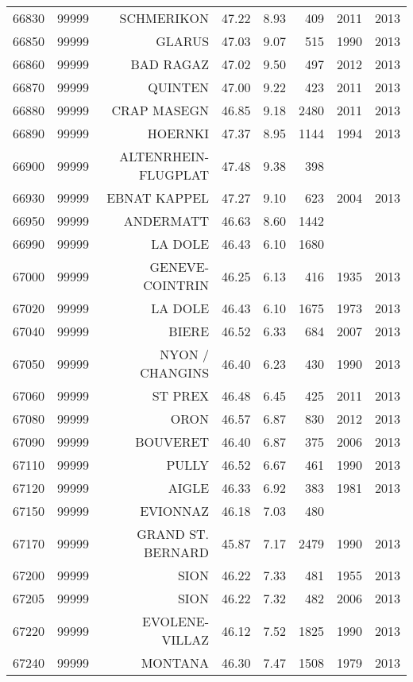 \begin{longtable}{rrrrrrrr}
  66830 & 99999 & SCHMERIKON & 47.22 & 8.93 & 409 & 2011 & 2013 \\ 
  66850 & 99999 & GLARUS & 47.03 & 9.07 & 515 & 1990 & 2013 \\ 
  66860 & 99999 & BAD RAGAZ & 47.02 & 9.50 & 497 & 2012 & 2013 \\ 
  66870 & 99999 & QUINTEN & 47.00 & 9.22 & 423 & 2011 & 2013 \\ 
  66880 & 99999 & CRAP MASEGN & 46.85 & 9.18 & 2480 & 2011 & 2013 \\ 
  66890 & 99999 & HOERNKI & 47.37 & 8.95 & 1144 & 1994 & 2013 \\ 
  66900 & 99999 & ALTENRHEIN-FLUGPLAT & 47.48 & 9.38 & 398 &  &  \\ 
  66930 & 99999 & EBNAT KAPPEL & 47.27 & 9.10 & 623 & 2004 & 2013 \\ 
  66950 & 99999 & ANDERMATT & 46.63 & 8.60 & 1442 &  &  \\ 
  66990 & 99999 & LA DOLE & 46.43 & 6.10 & 1680 &  &  \\ 
  67000 & 99999 & GENEVE-COINTRIN & 46.25 & 6.13 & 416 & 1935 & 2013 \\ 
  67020 & 99999 & LA DOLE & 46.43 & 6.10 & 1675 & 1973 & 2013 \\ 
  67040 & 99999 & BIERE & 46.52 & 6.33 & 684 & 2007 & 2013 \\ 
  67050 & 99999 & NYON / CHANGINS & 46.40 & 6.23 & 430 & 1990 & 2013 \\ 
  67060 & 99999 & ST PREX & 46.48 & 6.45 & 425 & 2011 & 2013 \\ 
  67080 & 99999 & ORON & 46.57 & 6.87 & 830 & 2012 & 2013 \\ 
  67090 & 99999 & BOUVERET & 46.40 & 6.87 & 375 & 2006 & 2013 \\ 
  67110 & 99999 & PULLY & 46.52 & 6.67 & 461 & 1990 & 2013 \\ 
  67120 & 99999 & AIGLE & 46.33 & 6.92 & 383 & 1981 & 2013 \\ 
  67150 & 99999 & EVIONNAZ & 46.18 & 7.03 & 480 &  &  \\ 
  67170 & 99999 & GRAND ST. BERNARD & 45.87 & 7.17 & 2479 & 1990 & 2013 \\ 
  67200 & 99999 & SION & 46.22 & 7.33 & 481 & 1955 & 2013 \\ 
  67205 & 99999 & SION & 46.22 & 7.32 & 482 & 2006 & 2013 \\ 
  67220 & 99999 & EVOLENE-VILLAZ & 46.12 & 7.52 & 1825 & 1990 & 2013 \\ 
  67240 & 99999 & MONTANA & 46.30 & 7.47 & 1508 & 1979 & 2013 \\ 

\end{longtable}
